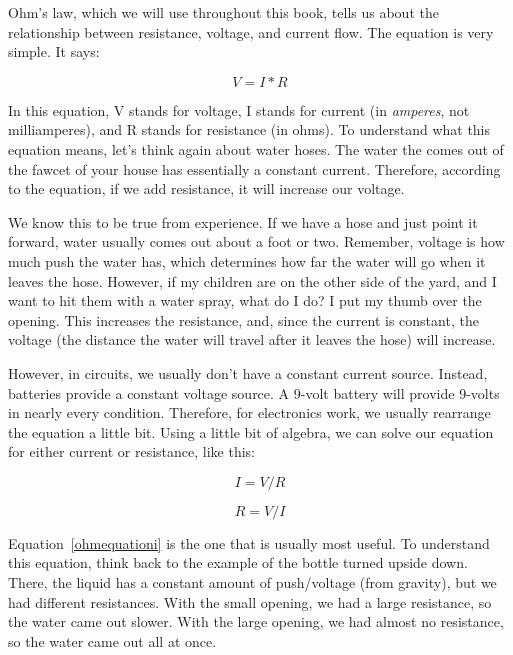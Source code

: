 Ohm's law, which we will use throughout this book, tells us about the relationship between resistance, voltage, and current flow.
The equation is very simple.
It says:

\begin{equation}
\label{ohmequationv}
V = I * R
\end{equation}

In this equation, V stands for voltage, I stands for current (in \emph{amperes}, not milliamperes), and R stands for resistance (in ohms).
To understand what this equation means, let's think again about water hoses.
The water the comes out of the fawcet of your house has essentially a constant current.
Therefore, according to the equation, if we add resistance, it will increase our voltage.

We know this to be true from experience. 
If we have a hose and just point it forward, water usually comes out about a foot or two.
Remember, voltage is how much push the water has, which determines how far the water will go when it leaves the hose.
However, if my children are on the other side of the yard, and I want to hit them with a water spray, what do I do?
I put my thumb over the opening.
This increases the resistance, and, since the current is constant, the voltage (the distance the water will travel after it leaves the hose) will increase.

However, in circuits, we usually don't have a constant current source.
Instead, batteries provide a constant voltage source.
A 9-volt battery will provide 9-volts in nearly every condition.
Therefore, for electronics work, we usually rearrange the equation a little bit.  
Using a little bit of algebra, we can solve our equation for either current or resistance, like this:

\begin{equation}
\label{ohmequationi}
I = V / R
\end{equation}

\begin{equation}
\label{ohmequationr}
R = V / I
\end{equation}

Equation~\ref{ohmequationi} is the one that is usually most useful.
To understand this equation, think back to the example of the bottle turned upside down.
There, the liquid has a constant amount of push/voltage (from gravity), but we had different resistances.
With the small opening, we had a large resistance, so the water came out slower.
With the large opening, we had almost no resistance, so the water came out all at once.

